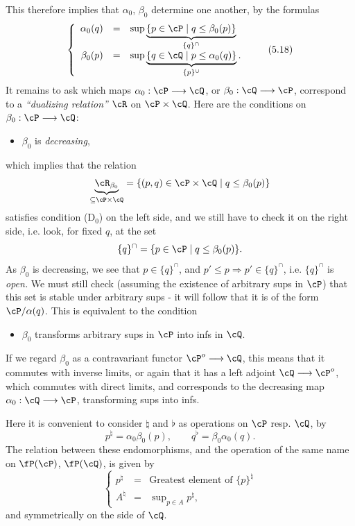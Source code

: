 This therefore implies that $\alpha_0$, $\beta_0$ determine one another, by the formulas
\[
\left\{
\begin{array}{rcl}
\alpha_0(q) & = & \sup \underbrace{\{p \in \cP \mid q \leq \beta_0(p)\}}_{\{q\}^{\cap}}\\[3ex]
\beta_0(p) & = & \sup \underbrace{\{q \in \cQ \mid p \leq \alpha_0(q)\}}_{\{p\}^{\cup}}.
\end{array}
\right.
\tag*{(5.18)}
\]
It remains to ask which maps $\alpha_0 : \cP \longrightarrow \cQ$, or $\beta_0 : \cQ \longrightarrow \cP$, correspond to a \textit{``dualizing relation''} %
$\cR$ on $\cP \times \cQ$. Here are the conditions on $\beta_0 : \cP \longrightarrow \cQ$:
\begin{itemize}[leftmargin=4em, labelsep=0.8em]
\item[\circled{a}] $\beta_0$ is \textit{decreasing},
\end{itemize}
which implies that the relation
\[
\underbrace{\cR_{\beta_0}}_{\subseteq \cP \times \cQ} = \{(p,q) \in \cP \times \cQ \mid q \leq \beta_0(p)\}
\]
satisfies condition (D$_0$) on the left side, and we still have to check it on the right side, i.e. look, for fixed $q$, at the set
\[
\{q\}^{\cap} = \{p \in \cP \mid q \leq \beta_0(p)\}.
\]
As $\beta_0$ is decreasing, we see that $p \in \{q\}^{\cap}$, and $p' \leq p \Longrightarrow p' \in \{q\}^{\cap}$, i.e. $\{q\}^{\cap}$ is \textit{open.} We must still check (assuming the existence of arbitrary sups in $\cP$) that this set is stable under arbitrary sups - it will follow that it is of the form $\cP/\alpha(q)$. This is equivalent to the condition
\begin{itemize}[leftmargin=4em, labelsep=0.8em]
\item[\circled{b}] $\beta_0$ transforms arbitrary sups in $\cP$ into infs in $\cQ$.
\end{itemize}
If we regard $\beta_0$ as a contravariant functor $\cP^{o} \longrightarrow \cQ$, this means that it commutes with inverse limits, or again that it has a left adjoint $\cQ \longrightarrow \cP^{o}$, which commutes with direct limits, and corresponds
to the decreasing map $\alpha_0 : \cQ \longrightarrow \cP$, transforming sups into infs.

Here it is convenient to consider $\natural$ and $\flat$ as operations on $\cP$ resp. $\cQ$, by
\[
p^{\natural} = \alpha_0\beta_0(p), \qquad q^{\flat} = \beta_0\alpha_0(q).
\tag*{(5.19)}
\]
The relation between these endomorphisms, and the operation of the same name on $\fP(\cP)$, $\fP(\cQ)$, is given by
\[
\left\{
\begin{array}{rcl}
p^{\natural} & = & \text{Greatest element of } \{p\}^{\natural}\\[1ex]
A^{\natural} & = & \sup\nolimits_{p \in A} p^{\natural},
\end{array}
\right.
\tag*{(5.20)}
\]
and symmetrically on the side of $\cQ$.

